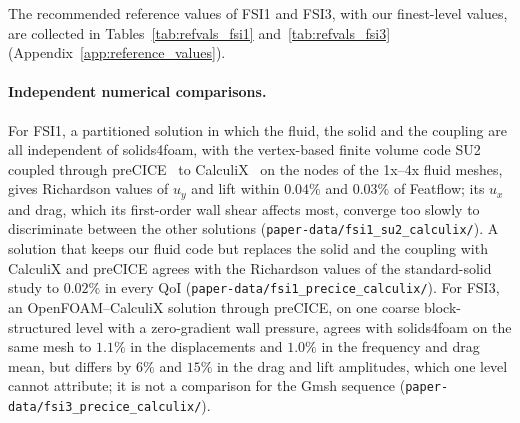 The recommended reference values of FSI1 and FSI3, with our finest-level values, are collected in Tables~\ref{tab:refvals_fsi1} and~\ref{tab:refvals_fsi3} (Appendix~\ref{app:reference_values}).

\paragraph{Independent numerical comparisons.}
For FSI1, a partitioned solution in which the fluid, the solid and the coupling are all independent of solids4foam, with the vertex-based finite volume code SU2~\citep{Economon2016,Economon2020} coupled through preCICE~\citep{Chourdakis2022} to CalculiX~\citep{Dhondt2004} on the nodes of the 1x--4x fluid meshes, gives Richardson values of $u_y$ and lift within $0.04\%$ and $0.03\%$ of Featflow; its $u_x$ and drag, which its first-order wall shear affects most, converge too slowly to discriminate between the other solutions (\texttt{paper-data/fsi1\_su2\_calculix/}). A solution that keeps our fluid code but replaces the solid and the coupling with CalculiX and preCICE agrees with the Richardson values of the standard-solid study to $0.02\%$ in every QoI (\texttt{paper-data/fsi1\_precice\_calculix/}).
For FSI3, an OpenFOAM--CalculiX solution through preCICE, on one coarse block-structured level with a zero-gradient wall pressure, agrees with solids4foam on the same mesh to $1.1\%$ in the displacements and $1.0\%$ in the frequency and drag mean, but differs by $6\%$ and $15\%$ in the drag and lift amplitudes, which one level cannot attribute; it is not a comparison for the Gmsh sequence (\texttt{paper-data/fsi3\_precice\_calculix/}).


